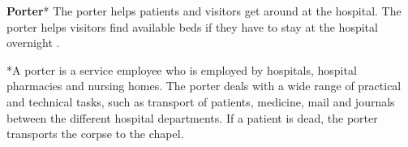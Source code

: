 \textbf{Porter}*
The porter helps patients and visitors get around at the hospital. The porter helps visitors find available beds if they have to stay at the hospital overnight \cite{ugd_port}. 

*A porter is a service employee who is employed by hospitals, hospital pharmacies and nursing homes. The porter deals with a wide range of practical and technical tasks, such as transport of patients, medicine, mail and journals between the different hospital departments\cite{ugd_port}. If a patient is dead, the porter transports the corpse to the chapel\cite{int_laila}.

